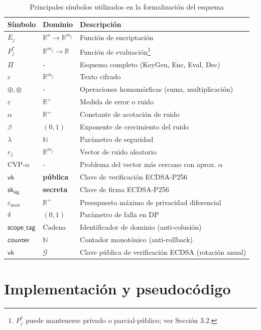 \documentclass[11pt]{article}
\theoremstyle{plain}
\begin{document}
\begin{table}[htbp]
\centering
\begin{tabular}{@{}lll@{}}
\toprule
\textbf{Símbolo} & \textbf{Dominio} & \textbf{Descripción} \\
\midrule
$E_j$ & $\mathbb{R}^n \rightarrow \mathbb{R}^{m_j}$ & Función de encriptación \\
$P^*_j$ & $\mathbb{R}^{m_j} \rightarrow \mathbb{R}$ & Función de evaluación\footnote{$P^*_j$ puede mantenerse privado o parcial-público; ver Sección 3.2.} \\
$\Pi$ & - & Esquema completo (KeyGen, Enc, Eval, Dec) \\
$c$ & $\mathbb{R}^{m_j}$ & Texto cifrado \\
$\oplus, \otimes$ & - & Operaciones homomórficas (suma, multiplicación) \\
$\varepsilon$ & $\mathbb{R}^+$ & Medida de error o ruido \\
$\alpha$ & $\mathbb{R}^+$ & Constante de acotación de ruido \\
$\beta$ & $(0,1)$ & Exponente de crecimiento del ruido \\
$\lambda$ & $\mathbb{N}$ & Parámetro de seguridad \\
$r_j$ & $\mathbb{R}^{m_j}$ & Vector de ruido aleatorio \\
CVP-$\alpha$ & - & Problema del vector más cercano con aprox. $\alpha$ \\
\midrule
$\mathsf{vk}$ & \textbf{pública} & Clave de verificación ECDSA-P256\\
$\mathsf{sk_{sig}}$& \textbf{secreta} & Clave de firma ECDSA-P256\\
\midrule
$\varepsilon_{\text{max}}$ & $\mathbb{R}^{+}$ & Presupuesto máximo de privacidad diferencial \\
$\delta$ & $(0,1)$ & Parámetro de falla en DP \\
$\textsf{scope\_tag}$& Cadena & Identificador de dominio (anti-colusión) \\
$\textsf{counter}$ & $\mathbb{N}$ & Contador monotónico (anti-rollback) \\
$\mathsf{vk}$ & $\mathcal{G}$ & Clave pública de verificación ECDSA (rotación anual) \\
\bottomrule
\end{tabular}
\caption{Principales símbolos utilizados en la formalización del esquema}
\label{tab:symbols}
\end{table}

\section{Implementación y pseudocódigo}
\end{document}
